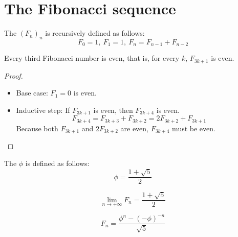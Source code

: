 \documentclass[main.tex]{subfiles}
\begin{document}
\section{The Fibonacci sequence}

\begin{de}
  The  $(F_{n})_{n}$ is recursively defined as follows:
  \[ F_{0} = 1,\ F_{1} = 1,\ F_{n} = F_{n-1} + F_{n-2} \]
\end{de}

\begin{prop}
  \label{prop:every-third-fibonacci-term-even}
  Every third Fibonacci number is even, that is, for every $k$, $F_{3k+1}$ is even.
  \begin{proof}             
    \noindent             
    \begin{itemize}       
      \item Base case: $F_{1} = 0$ is even.
      \item Inductive step: If $F_{3k+1}$ is even, then $F_{3k+4}$ is even.\\
        \[
          F_{3k+4} = F_{3k+3} + F_{3k+2} = 2F_{3k+2} + F_{3k+1}
        \]
        Because both $F_{3k+1}$ and $2F_{3k+2}$ are even, $F_{3k+4}$ must be even.
    \end{itemize}
  \end{proof}
\end{prop}

\begin{de}
  The  $\phi$ is defined as follows:
  \[ \phi = \frac{1 + \sqrt{5}}{2} \]
\end{de}

\begin{prop}
  \[ \lim_{n \rightarrow +\infty}F_{n} = \frac{1 + \sqrt{5}}{2} \]
\end{prop}

\begin{prop}
  \label{prop:closed-form-expression-fibonacci-term}
  \[ F_{n} = \frac{\phi^{n} - (-\phi)^{-n}}{\sqrt{5}} \]
\end{prop}
\end{document}
